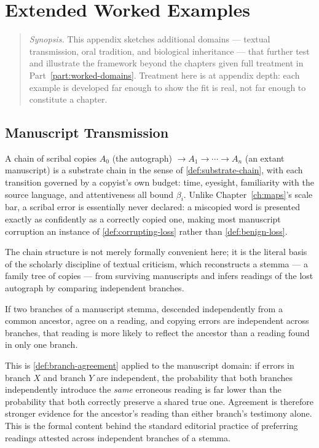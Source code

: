 \chapter{Extended Worked Examples}
\label{app:extended-examples}

\begin{quotation}
\noindent\textit{Synopsis.} This appendix sketches additional domains ---
textual transmission, oral tradition, and biological inheritance ---
that further test and illustrate the framework beyond the chapters given
full treatment in Part~\ref{part:worked-domains}. Treatment here is at
appendix depth: each example is developed far enough to show the fit is
real, not far enough to constitute a chapter.

\end{quotation}

\section{Manuscript Transmission}

A chain of scribal copies $A_0$ (the autograph) $\to A_1 \to \cdots \to
A_n$ (an extant manuscript) is a substrate chain in the sense of
\cref{def:substrate-chain}, with each transition governed by a
copyist's own budget: time, eyesight, familiarity with the source
language, and attentiveness all bound $\beta_i$. Unlike
Chapter~\ref{ch:maps}'s scale bar, a scribal error is essentially never
declared: a miscopied word is presented exactly as confidently as a
correctly copied one, making most manuscript corruption an instance of
\cref{def:corrupting-loss} rather than \cref{def:benign-loss}.

The chain structure is not merely formally convenient here; it is the
literal basis of the scholarly discipline of textual criticism, which
reconstructs a stemma --- a family tree of copies --- from surviving
manuscripts and infers readings of the lost autograph by comparing
independent branches.

\begin{proposition}
\label{prop:stemma-agreement}
If two branches of a manuscript stemma, descended independently from a
common ancestor, agree on a reading, and copying errors are independent
across branches, that reading is more likely to reflect the ancestor
than a reading found in only one branch.
\end{proposition}

\begin{proofsketch}
This is \cref{def:branch-agreement} applied to the manuscript domain: if
errors in branch $X$ and branch $Y$ are independent, the probability
that both branches independently introduce the \emph{same} erroneous
reading is far lower than the probability that both correctly preserve a
shared true one. Agreement is therefore stronger evidence for the
ancestor's reading than either branch's testimony alone. This is the
formal content behind the standard editorial practice of preferring
readings attested across independent branches of a stemma.
\end{proofsketch}

